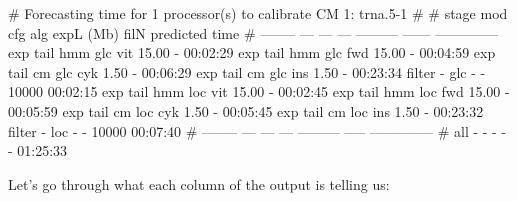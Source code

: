 \begin{sreoutput}
# Forecasting time for 1 processor(s) to calibrate CM 1: trna.5-1
#
# stage     mod  cfg  alg  expL (Mb)   filN predicted time
# --------  ---  ---  ---  --------- ------ --------------
  exp tail  hmm  glc  vit      15.00      -       00:02:29
  exp tail  hmm  glc  fwd      15.00      -       00:04:59
  exp tail   cm  glc  cyk       1.50      -       00:06:29
  exp tail   cm  glc  ins       1.50      -       00:23:34
  filter      -  glc    -          -  10000       00:02:15
  exp tail  hmm  loc  vit      15.00      -       00:02:45
  exp tail  hmm  loc  fwd      15.00      -       00:05:59
  exp tail   cm  loc  cyk       1.50      -       00:05:45
  exp tail   cm  loc  ins       1.50      -       00:23:32
  filter      -  loc    -          -  10000       00:07:40
# --------  ---  ---  ---  ---------  ----- --------------
# all         -    -    -          -      -       01:25:33
\end{sreoutput}


Let's go through what each column of the output is telling us:

